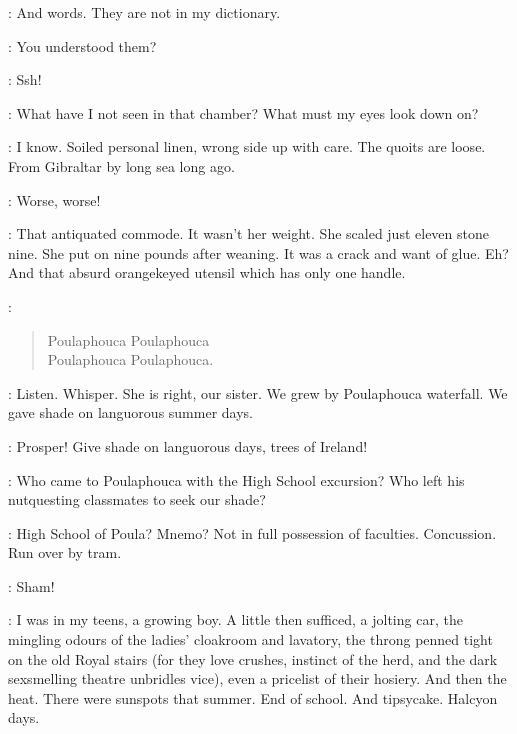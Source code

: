 \Nymph:
And words.
They are not in my dictionary.

\Bloom:
You understood them?

\Yews:
Ssh!

\Nymph:
What have I not seen in that chamber?
What must my eyes look down on?

\Bloom:
I know.
Soiled personal linen, wrong side up with care.
The quoits are loose.
From Gibraltar by long sea long ago.

\Nymph:
Worse, worse!

\Bloom:
That antiquated commode.
It wasn't her weight.
She scaled just eleven stone nine.
She put on nine pounds after weaning.
It was a crack and want of glue.
Eh?
And that absurd orangekeyed utensil which has only one handle.


\Waterfall:
\begin{verse}
    Poulaphouca Poulaphouca\\
%
    Poulaphouca Poulaphouca.
\end{verse}

\Yews:
Listen.
Whisper.
She is right, our sister.
We grew by Poulaphouca waterfall.
We gave shade on languorous summer days.

\JohnWyse:
Prosper!
Give shade on languorous days, trees of Ireland!

\Yews:
Who came to Poulaphouca with the High School excursion?
Who left his nutquesting classmates to seek our shade?

\Bloom:
High School of Poula?
Mnemo?
Not in full possession of faculties.
Concussion.
Run over by tram.

\Echo:
Sham!

\Bloom:
I was in my teens, a growing boy.
A little then sufficed, a jolting car,
the mingling odours of the ladies' cloakroom and lavatory,
the throng penned tight on the old Royal stairs
(for they love crushes, instinct of the herd,
and the dark sexsmelling theatre unbridles vice),
even a pricelist of their hosiery.
And then the heat.
There were sunspots that summer.
End of school.
And tipsycake.
Halcyon days.

